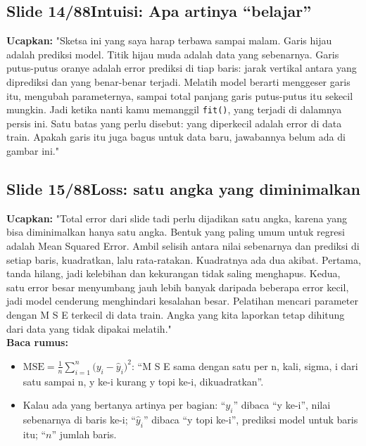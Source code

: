 \documentclass[11pt]{article}
\renewcommand{\framebox}[1]{\colorbox{acc!15}{\textcolor{acc}{\textbf{#1}}}}
\begin{document}
\subsection*{\framebox{Slide 14/88}\quad Intuisi: Apa artinya ``belajar''}
\textbf{Ucapkan:} "Sketsa ini yang saya harap terbawa sampai malam. Garis hijau adalah prediksi model. Titik hijau muda adalah data yang sebenarnya. Garis putus-putus oranye adalah error prediksi di tiap baris: jarak vertikal antara yang diprediksi dan yang benar-benar terjadi. Melatih model berarti menggeser garis itu, mengubah parameternya, sampai total panjang garis putus-putus itu sekecil mungkin. Jadi ketika nanti kamu memanggil \texttt{fit()}, yang terjadi di dalamnya persis ini. Satu batas yang perlu disebut: yang diperkecil adalah error di data train. Apakah garis itu juga bagus untuk data baru, jawabannya belum ada di gambar ini."\\[2pt]

\subsection*{\framebox{Slide 15/88}\quad Loss: satu angka yang diminimalkan}
\textbf{Ucapkan:} "Total error dari slide tadi perlu dijadikan satu angka, karena yang bisa diminimalkan hanya satu angka. Bentuk yang paling umum untuk regresi adalah Mean Squared Error. Ambil selisih antara nilai sebenarnya dan prediksi di setiap baris, kuadratkan, lalu rata-ratakan. Kuadratnya ada dua akibat. Pertama, tanda hilang, jadi kelebihan dan kekurangan tidak saling menghapus. Kedua, satu error besar menyumbang jauh lebih banyak daripada beberapa error kecil, jadi model cenderung menghindari kesalahan besar. Pelatihan mencari parameter dengan M S E terkecil di data train. Angka yang kita laporkan tetap dihitung dari data yang tidak dipakai melatih."\\[2pt]
\textbf{Baca rumus:}\\[2pt]
\begin{itemize}\setlength\itemsep{0.2em}
\item $\text{MSE} = \frac{1}{n}\sum_{i=1}^{n}\bigl(y_i - \hat{y}_i\bigr)^2$: ``M S E sama dengan satu per n, kali, sigma, i dari satu sampai n, y ke-i kurang y topi ke-i, dikuadratkan''.
\item Kalau ada yang bertanya artinya per bagian: ``$y_i$'' dibaca ``y ke-i'', nilai sebenarnya di baris ke-i; ``$\hat{y}_i$'' dibaca ``y topi ke-i'', prediksi model untuk baris itu; ``$n$'' jumlah baris.
\end{itemize}
\end{document}
